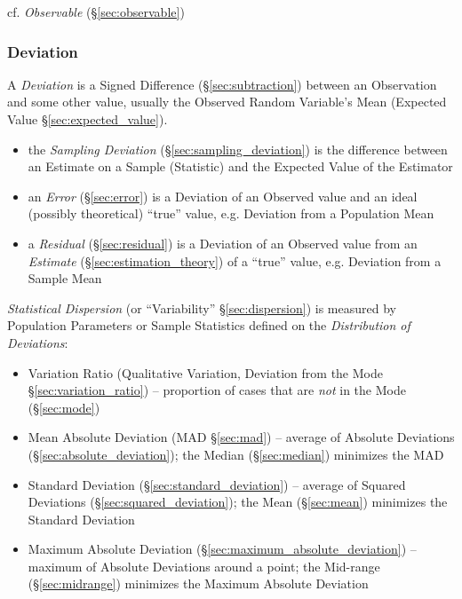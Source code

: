 \fist cf. \emph{Observable} (\S\ref{sec:observable})



\subsubsection{Deviation}\label{sec:deviation}

A \emph{Deviation} is a Signed Difference (\S\ref{sec:subtraction}) between an
Observation and some other value, usually the Observed Random Variable's Mean
(Expected Value \S\ref{sec:expected_value}).

\begin{itemize}
  \item the \emph{Sampling Deviation} (\S\ref{sec:sampling_deviation}) is the
    difference between an Estimate on a Sample (Statistic) and the Expected
    Value of the Estimator
  \item an \emph{Error} (\S\ref{sec:error}) is a Deviation of an Observed value
    and an ideal (possibly theoretical) ``true'' value, e.g. Deviation from a
    Population Mean
  \item a \emph{Residual} (\S\ref{sec:residual}) is a Deviation of an Observed
    value from an \emph{Estimate} (\S\ref{sec:estimation_theory}) of a ``true''
    value, e.g. Deviation from a Sample Mean
\end{itemize}

\emph{Statistical Dispersion} (or ``Variability'' \S\ref{sec:dispersion}) is
measured by Population Parameters or Sample Statistics defined on the
\emph{Distribution of Deviations}:
\begin{itemize}
  \item Variation Ratio (Qualitative Variation, Deviation from the Mode
    \S\ref{sec:variation_ratio}) -- proportion of cases that are \emph{not} in
    the Mode (\S\ref{sec:mode})
  \item Mean Absolute Deviation (MAD \S\ref{sec:mad}) -- average of Absolute
    Deviations (\S\ref{sec:absolute_deviation}); the Median (\S\ref{sec:median})
    minimizes the MAD
  \item Standard Deviation (\S\ref{sec:standard_deviation}) -- average of
    Squared Deviations (\S\ref{sec:squared_deviation}); the Mean
    (\S\ref{sec:mean}) minimizes the Standard Deviation
  \item Maximum Absolute Deviation (\S\ref{sec:maximum_absolute_deviation}) --
    maximum of Absolute Deviations around a point; the Mid-range
    (\S\ref{sec:midrange}) minimizes the Maximum Absolute Deviation
\end{itemize}

